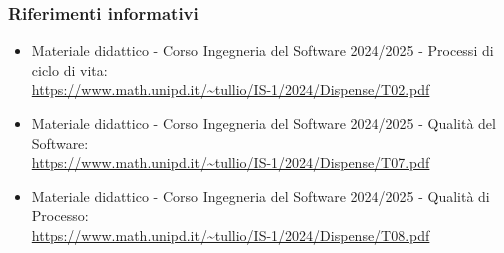         \subsubsection{Riferimenti informativi}
        \begin{itemize}
            \item Materiale didattico - Corso Ingegneria del Software 2024/2025 - Processi di ciclo di vita:  \\
            \url{https://www.math.unipd.it/~tullio/IS-1/2024/Dispense/T02.pdf} 
            \item Materiale didattico - Corso Ingegneria del Software 2024/2025 - Qualità del Software: \\ 
            \url{https://www.math.unipd.it/~tullio/IS-1/2024/Dispense/T07.pdf} 
            \item Materiale didattico - Corso Ingegneria del Software 2024/2025 - Qualità di Processo:  \\
            \url{https://www.math.unipd.it/~tullio/IS-1/2024/Dispense/T08.pdf}
        \end{itemize}

